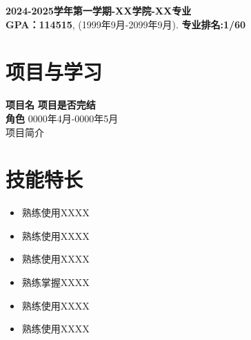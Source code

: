     
    \textbf{2024-2025学年第一学期-XX学院-XX专业} \\
    \textbf{GPA：114515}, (1999年9月-2099年9月). \hfill 
    \textbf{专业排名:1/60}
    


 \section{\makebox[\widthof{\faChalkboardTeacher}][c]{\color{WHU_Blue}{\faChalkboardTeacher}}\quad 项目与学习}
    \vspace{0.5em}
    {\large{\textbf{项目名}}} \hfill {\textbf{项目是否完结}}\\
    \textbf{角色} \hfill 0000年4月-0000年5月\\
    项目简介

%    

 \section{\makebox[\widthof{\faWrench}][c]{\color{WHU_Blue}{\faWrench}}\quad 技能特长}
  \vspace{0.5em}
  \begin{itemize}
 	     \item 熟练使用XXXX
 	     \item 熟练使用XXXX
 	     \item 熟练使用XXXX
 	     \item 熟练掌握XXXX
 	     \item 熟练使用XXXX
 	     \item 熟练使用XXXX
 	 \end{itemize}
    
